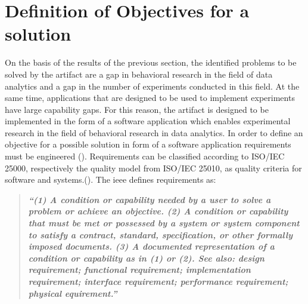 \section{Definition of Objectives for a solution}\label{sec:objectForSolution}

On the basis of the results of the previous section, the identified problems to be solved by the artifact are a gap in behavioral research in the field of data analytics and a gap in the number of experiments conducted in this field. At the same time, applications that are designed to be used to implement experiments have large capability gaps. For this reason, the artifact is designed to be implemented in the form of a software application which enables experimental research in the field of behavioral research in data analytics. In order to define an objective for a possible solution in form of a software application requirements must be engineered (\cite{Seacord.2003}). Requirements can be classified according to ISO/IEC 25000, respectively the quality model from ISO/IEC 25010, as quality criteria for software and systems.(\cite{ISOIEC25010.2011}). The \ac{ieee} defines requirements as:
\begin{quote}
    \textbf{\textit{\enquote{(1) A condition or capability needed by a user to solve a problem or achieve an objective. (2) A condition or capability that must be met or possessed by a system or system component to satisfy a contract, standard, specification, or other formally imposed documents. (3) A documented representation of a condition or capability as in (1) or (2). See also: design requirement; functional requirement; implementation requirement; interface requirement; performance requirement; physical equirement.}}} \cite{IEEE.1990}
\end{quote}  
